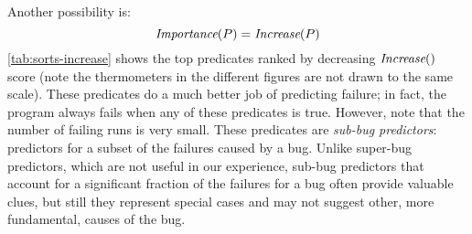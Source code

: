 Another possibility is:
\[ \textit{Importance}(P) = \textit{Increase}(P) \]
\autoref{tab:sorts-increase} shows the top predicates ranked by decreasing
$\textit{Increase}()$ score (note the thermometers in the different figures
are not drawn to the same scale).  These predicates do a much better
job of predicting failure; in fact, the program always fails when any
of these predicates is true. However, note that the number of failing
runs is very small.  These predicates are {\em sub-bug predictors}:
predictors for a subset of the failures caused by a bug.  Unlike
super-bug predictors, which are not useful in our experience, sub-bug
predictors that account for a significant fraction of the failures for
a bug often provide valuable clues, but still they represent special
cases and may not suggest other, more fundamental, causes of the bug.

